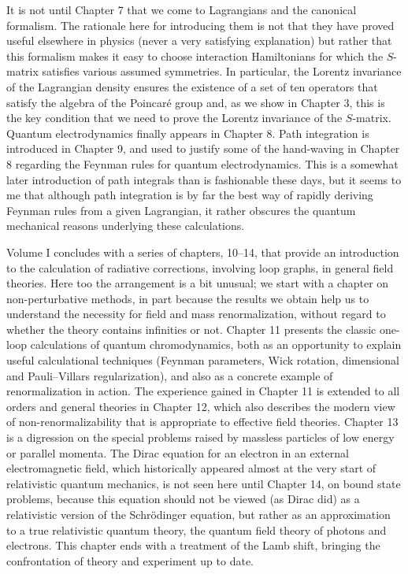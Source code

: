 It is not until Chapter 7 that we come to Lagrangians and the canonical
formalism. The rationale here for introducing them is not that they have proved
useful elsewhere in physics (never a very satisfying explanation) but rather
that this formalism makes it easy to choose interaction Hamiltonians for which
the $S$-matrix satisfies various assumed symmetries. In particular, the Lorentz
invariance of the Lagrangian density ensures the existence of a set of ten
operators that satisfy the algebra of the Poincar\'e group and, as we show in
Chapter 3, this is the key condition that we need to prove the Lorentz
invariance of the $S$-matrix. Quantum electrodynamics finally appears in Chapter
8. Path integration is introduced in Chapter 9, and used to justify some of the
hand-waving in Chapter 8 regarding the Feynman rules for quantum
electrodynamics. This is a somewhat later introduction of path integrals than is
fashionable these days, but it seems to me that although path integration is by
far the best way of rapidly deriving Feynman rules from a given Lagrangian, it
rather obscures the quantum mechanical reasons underlying these calculations.

Volume I concludes with a series of chapters, 10--14, that provide an
introduction to the calculation of radiative corrections, involving loop
graphs, in general field theories. Here too the arrangement is a bit unusual; we
start with a chapter on non-perturbative methods, in part because the results we
obtain help us to understand the necessity for field and mass renormalization,
without regard to whether the theory contains infinities or not. Chapter 11
presents the classic one-loop calculations of quantum chromodynamics, both as an
opportunity to explain useful calculational techniques (Feynman parameters,
Wick rotation, dimensional and Pauli--Villars regularization), and also as a
concrete example of renormalization in action. The experience gained in Chapter
11 is extended to all orders and general theories in Chapter 12, which also
describes the modern view of non-renormalizability that is appropriate to
effective field theories. Chapter 13 is a digression on the special problems
raised by massless particles of low energy or parallel momenta. The Dirac
equation for an electron in an external electromagnetic field, which
historically appeared almost at the very start of relativistic quantum
mechanics, is not seen here until Chapter 14, on bound state problems, because
this equation should not be viewed (as Dirac did) as a relativistic version of
the Schr\"odinger equation, but rather as an approximation to a true relativistic
quantum theory, the quantum field theory of photons and electrons. This chapter
ends with a treatment of the Lamb shift, bringing the confrontation of theory
and experiment up to date.

